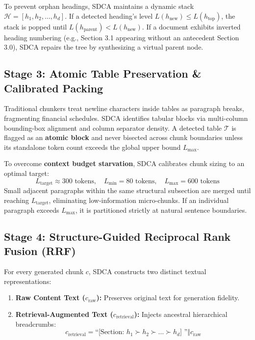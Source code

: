 \documentclass[conference]{IEEEtran}
\begin{document}
To prevent orphan headings, SDCA maintains a dynamic stack $\mathcal{H} = [h_1, h_2, \dots, h_d]$. If a detected heading's level $L(h_{\text{new}}) \le L(h_{\text{top}})$, the stack is popped until $L(h_{\text{parent}}) < L(h_{\text{new}})$. If a document exhibits inverted heading numbering (e.g., Section 3.1 appearing without an antecedent Section 3.0), SDCA repairs the tree by synthesizing a virtual parent node.

\subsection{Stage 3: Atomic Table Preservation \& Calibrated Packing}
Traditional chunkers treat newline characters inside tables as paragraph breaks, fragmenting financial schedules. SDCA identifies tabular blocks via multi-column bounding-box alignment and column separator density. A detected table $\mathcal{T}$ is flagged as an \textbf{atomic block} and never bisected across chunk boundaries unless its standalone token count exceeds the global upper bound $L_{\text{max}}$.

To overcome \textbf{context budget starvation}, SDCA calibrates chunk sizing to an optimal target:
\begin{equation}
L_{\text{target}} \approx 300 \text{ tokens}, \quad L_{\text{min}} = 80 \text{ tokens}, \quad L_{\text{max}} = 600 \text{ tokens}
\end{equation}
Small adjacent paragraphs within the same structural subsection are merged until reaching $L_{\text{target}}$, eliminating low-information micro-chunks. If an individual paragraph exceeds $L_{\text{max}}$, it is partitioned strictly at natural sentence boundaries.

\subsection{Stage 4: Structure-Guided Reciprocal Rank Fusion (RRF)}
For every generated chunk $c$, SDCA constructs two distinct textual representations:
\begin{enumerate}
    \item \textbf{Raw Content Text ($c_{\text{raw}}$):} Preserves original text for generation fidelity.
    \item \textbf{Retrieval-Augmented Text ($c_{\text{retrieval}}$):} Injects ancestral hierarchical breadcrumbs:
    \begin{equation}
    c_{\text{retrieval}} = \text{``[Section: } h_1 \succ h_2 \succ \dots \succ h_d \text{] ''} \mathbin{\Vert} c_{\text{raw}}
    \end{equation}
\end{enumerate}
\end{document}
